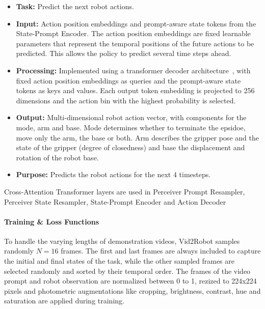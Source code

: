 \begin{enumerate}
        \begin{itemize}
            \item \textbf{Task:} 
            Predict the next robot actions.
            \item \textbf{Input:} Action position embeddings and prompt-aware state tokens from the State-Prompt Encoder. The action position embeddings are fixed learnable parameters that represent the temporal positions of the future actions to be predicted. This allows the policy to predict several time steps ahead.
            \item \textbf{Processing:} 
            Implemented using a transformer decoder architecture~\cite{Zhao2023LearningFB}, with fixed action position embeddings as queries and the prompt-aware state tokens as keys and values. Each output token embedding is projected to 256 dimensions and the action bin with the highest probability is selected.
            \item \textbf{Output:} 
            Multi-dimensional robot action vector, with components for the mode, arm and base. Mode determines whether to terminate the epsidoe, move only the arm, the base or both. Arm describes the gripper pose and the state of the gripper (degree of closedness) and base the displacement and rotation of the robot base.
            \item \textbf{Purpose:} 
            Predicts the robot actions for the next 4 timesteps.
        \end{itemize}
\end{enumerate}
Cross-Attention Transformer layers are used in Perceiver Prompt Resampler, Perceiver State Resampler, State-Prompt Encoder and Action Decoder


\paragraph{Training \& Loss Functions}
To handle the varying lengths of demonstration videos, Vid2Robot samples randomly $N = 16$ frames. The first and last frames are always included to capture the initial and final states of the task, while the other sampled frames are selected randomly and sorted by their temporal order. The frames of the video prompt and robot observation are normalized between 0 to 1, rezized to 224x224 pixels and photometric augmentations like cropping, brightness, contrast, hue and saturation are applied during training.



